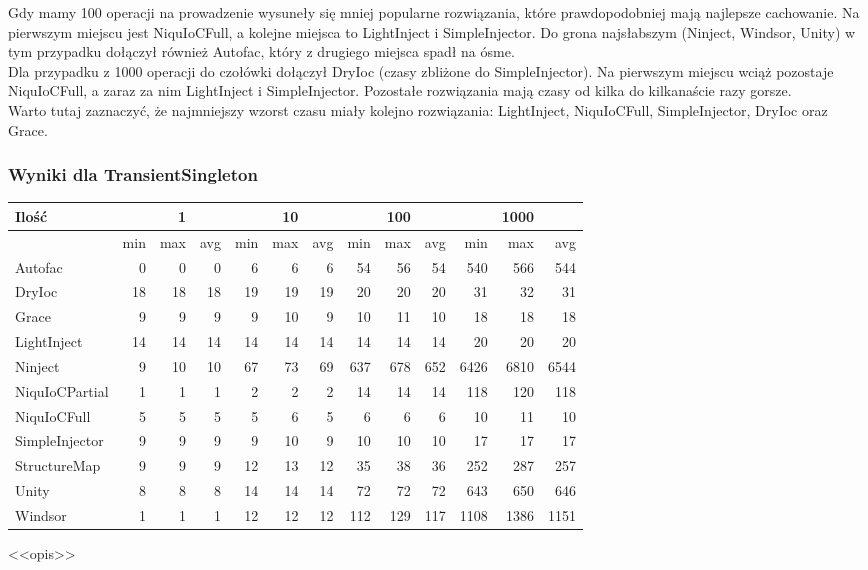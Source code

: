 \documentclass[12pt]{article}
\begin{document}
Gdy mamy 100 operacji na prowadzenie wysuneły się mniej popularne rozwiązania, które prawdopodobniej mają najlepsze cachowanie. Na pierwszym miejscu jest NiquIoCFull, a kolejne miejsca to LightInject i SimpleInjector. Do grona najsłabszym (Ninject, Windsor, Unity) w tym przypadku dołączył również Autofac, który z drugiego miejsca spadł na ósme.\\
Dla przypadku z 1000 operacji do czołówki dołączył DryIoc (czasy zbliżone do SimpleInjector). Na pierwszym miejscu wciąż pozostaje NiquIoCFull, a zaraz za nim LightInject i SimpleInjector. Pozostałe rozwiązania mają czasy od kilka do kilkanaście razy gorsze.\\
Warto tutaj zaznaczyć, że najmniejszy wzorst czasu miały kolejno rozwiązania: LightInject, NiquIoCFull, SimpleInjector, DryIoc oraz Grace.

\subsubsection{Wyniki dla TransientSingleton}
\begin{center}
\begin{small}
	\begin{tabular}{ | l | r r r | r r r | r r r | r r r | }
    		\hline
     		Ilość & & 1 & & & 10 & & & 100 & & & 1000 & \\ \hline
     		 & min & max & avg & min & max & avg & min & max & avg & min & max & avg \\ \hline
    		Autofac & 0 & 0 & 0 & 6 & 6 & 6 & 54 & 56 & 54 & 540 & 566 & 544 \\ \hline
		DryIoc & 18 & 18 & 18 & 19 & 19 & 19 & 20 & 20 & 20 & 31 & 32 & 31 \\ \hline
		Grace & 9 & 9 & 9 & 9 & 10 & 9 & 10 & 11 & 10 & 18 & 18 & 18 \\ \hline
		LightInject & 14 & 14 & 14 & 14 & 14 & 14 & 14 & 14 & 14 & 20 & 20 & 20 \\ \hline
		Ninject & 9 & 10 & 10 & 67 & 73 & 69 & 637 & 678 & 652 & 6426 & 6810 & 6544 \\ \hline
		NiquIoCPartial & 1 & 1 & 1 & 2 & 2 & 2 & 14 & 14 & 14 & 118 & 120 & 118 \\ \hline
		NiquIoCFull & 5 & 5 & 5 & 5 & 6 & 5 & 6 & 6 & 6 & 10 & 11 & 10 \\ \hline
		SimpleInjector & 9 & 9 & 9 & 9 & 10 & 9 & 10 & 10 & 10 & 17 & 17 & 17 \\ \hline
		StructureMap & 9 & 9 & 9 & 12 & 13 & 12 & 35 & 38 & 36 & 252 & 287 & 257 \\ \hline
		Unity & 8 & 8 & 8 & 14 & 14 & 14 & 72 & 72 & 72 & 643 & 650 & 646 \\ \hline
		Windsor & 1 & 1 & 1 & 12 & 12 & 12 & 112 & 129 & 117 & 1108 & 1386 & 1151 \\
    		\hline
  	\end{tabular}
\end{small}
\end{center}
<<opis>>
\end{document}
